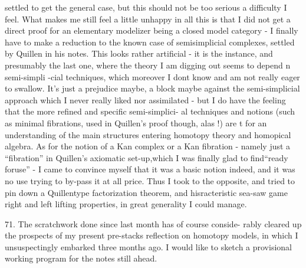 settled to get the general case,  but this should not be too serious a
difficulty I feel. What makes me still feel a little unhappy in all this\hand{,}
is that I did not get a direct proof for an elementary modelizer being a
closed model category  -  I finally have to make a reduction to the known
case of semisimplicial complexes,  settled by Quillen in his notes.  This
 looks rather artificial  -  it is the  instance,  and presumably the
last one,  where the theory I am digging out seems to depend n semi-simpli
-cial techniques, which moreover I dont know and am not really eager to
swallow.  It's just a prejudice maybe,   a block maybe against the
semi-simplicial approach which I never really liked nor assimilated  -
but I do have the feeling that the more refined and specific semi-simplici-%
al techniques and notions (such as minimal fibrations,  used in Quillen's
proof though,  alas !)  are  t for an understanding of
the main structures entering homotopy theory and homopical algebra.  As
for the notion of a Kan complex or a Kan fibration  -  namely just a
``fibration'' in Quillen's axiomatic set-up,which I was  finally glad to
find\hand{,}``ready foruse''  -  I  came to convince myself that it was a
basic notion indeed,  and it was no use trying to by-pass it at all price.
Thus I took to the opposite,  and tried to  pin down a Quillen\inserted{-}type
factorization theorem,  and  hisracteristic sea-saw game  right
and left lifting properties,  in  great generality I could manage.


71.  The  scratchwork done since last month has of course conside-%
rably cleared up the prospects of my present pre-stacks reflection on
homotopy models,  in which I unsuspectingly embarked three months ago.
 I would like to sketch a provisional working program for the notes
still ahead.


